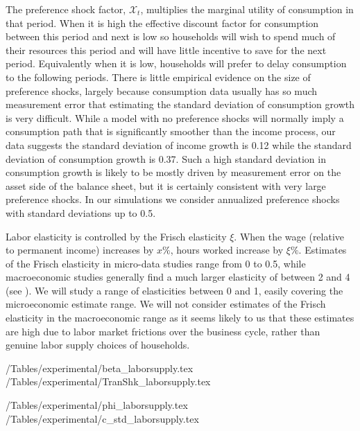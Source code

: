 \documentclass[titlepage]{\econtex}\newcommand{\texname}{IncomeUncertainty}
\begin{document}
The preference shock factor, $\mathcal{X}_t$, multiplies the marginal utility of consumption in that period. When it is high the effective discount factor for consumption between this period and next is low so households will wish to spend much of their resources this period and will have little incentive to save for the next period. Equivalently when it is low, households will prefer to delay consumption to the following periods. There is little empirical evidence on the size of preference shocks, largely because consumption data usually has so much measurement error that estimating the standard deviation of consumption growth is very difficult. While a model with no preference shocks will normally imply a consumption path that is significantly smoother than the income process, our data suggests the standard deviation of income growth is 0.12 while the standard deviation of consumption growth is 0.37. Such a high standard deviation in consumption growth is likely to be mostly driven by measurement error on the asset side of the balance sheet, but it is certainly consistent with very large preference shocks. In our simulations we consider annualized preference shocks with standard deviations up to 0.5.

Labor elasticity is controlled by the Frisch elasticity $\xi$. When the wage (relative to permanent income) increases by $x\%$, hours worked increase by $\xi\%$. Estimates of the Frisch elasticity in micro-data studies range from 0 to 0.5, while macroeconomic studies generally find a much larger elasticity of between 2 and 4 (see \cite{peterman_reconciling_2016}). We will study a range of elasticities between 0 and 1, easily covering the microeconomic estimate range. We will not consider estimates of the Frisch elasticity in the macroeconomic range as it seems likely to us that these estimates are high due to labor market frictions over the business cycle, rather than genuine labor supply choices of households.

\begin{center}
	\econtexRoot/Tables/experimental/beta_laborsupply.tex	
	\econtexRoot/Tables/experimental/TranShk_laborsupply.tex		
	\label{table:fitted_beta_and_transtd}
\end{center}

\begin{center}
	\econtexRoot/Tables/experimental/phi_laborsupply.tex	
	\econtexRoot/Tables/experimental/c_std_laborsupply.tex		
	\label{table:phi_laborsupply}
\end{center}
\end{document}
